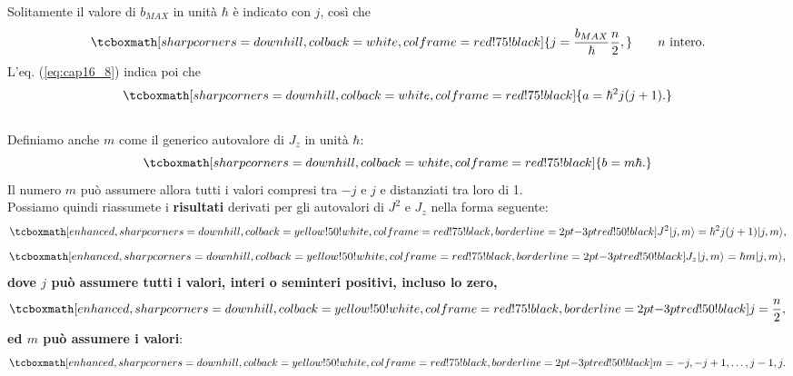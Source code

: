 Solitamente il valore di $b_{MAX}$ in unità $\hbar$ è indicato con $j$, così che
	\begin{equation}
		\tcboxmath[sharp corners=downhill, colback=white, colframe=red!75!black]{
			j= \frac{b_{MAX}}{\hbar} \frac{n}{2},
			} \qquad n \textrm{ intero.}
	\end{equation}
L'eq. (\ref{eq:cap16_8}) indica poi che
	\begin{equation}
		\tcboxmath[sharp corners=downhill, colback=white, colframe=red!75!black]{
			a= \hbar ^2 j(j+1).
			}
	\end{equation}\\

Definiamo anche $m$ come il generico autovalore di $J_z$ in unità $\hbar$:
	\begin{equation}
		\tcboxmath[sharp corners=downhill, colback=white, colframe=red!75!black]{
			b=m\hbar .
			}
	\end{equation}
Il numero $m$ può assumere allora tutti i valori compresi tra $-j$ e $j$ e distanziati tra loro di 1.\\

Possiamo quindi riassumete i \textbf{risultati} derivati per gli autovalori di $J^2$ e $J_z$ nella forma seguente:
	\begin{equation}
		 \tcboxmath[enhanced, sharp corners=downhill, colback=yellow!50!white, colframe=red!75!black, borderline={2pt}{-3pt}{red!50!black}]{
		 	J^2\vert j, m \rangle =\hbar ^2 j (j+1)\vert j, m \rangle , 
		 	}
	\end{equation}
	\begin{equation}
		 \tcboxmath[enhanced, sharp corners=downhill, colback=yellow!50!white, colframe=red!75!black, borderline={2pt}{-3pt}{red!50!black}]{
		 	J_z\vert j, m \rangle =\hbar  m\vert j, m \rangle ,
		 	}
	\end{equation}
\textbf{dove $j$ può assumere tutti i valori, interi o seminteri positivi, incluso  lo zero,}
	\begin{equation}
		\tcboxmath[enhanced, sharp corners=downhill, colback=yellow!50!white, colframe=red!75!black, borderline={2pt}{-3pt}{red!50!black}]{
			j= \frac{n}{2},
			}
	\end{equation}
\textbf{ed $m$ può assumere i valori}:
	\begin{equation}
		\tcboxmath[enhanced, sharp corners=downhill, colback=yellow!50!white, colframe=red!75!black, borderline={2pt}{-3pt}{red!50!black}]{
			m=-j, -j+1,\dots , j-1, j.
			}
	\end{equation}\\
	

